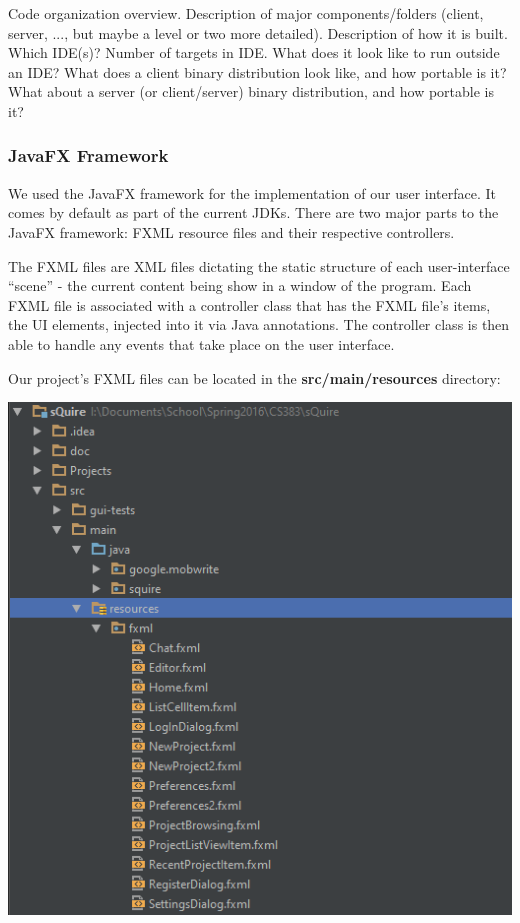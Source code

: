 \documentclass[twoside,letterpaper]{article}
\begin{document}
Code organization overview. Description of major components/folders (client, server, ..., but maybe a level or two more detailed). Description of how it is built. Which IDE(s)? Number of targets in IDE. What does it look like to run outside an IDE? What does a client binary distribution look like, and how portable is it? What about a server (or client/server) binary distribution, and how portable is it?


\subsubsection{JavaFX Framework}

We used the JavaFX framework for the implementation of our user interface. It comes by default as part of the current JDKs. There are two major parts to the JavaFX framework: FXML resource files and their respective controllers.


The FXML files are XML files dictating the static structure of each user-interface ``scene'' - the current content being show in a window of the program. Each FXML file is associated with a controller class that has the FXML file's items, the UI elements, injected into it via Java annotations. The controller class is then able to handle any events that take place on the user interface. 


Our project's FXML files can be located in the \textbf{src/main/resources} directory: \bigskip


\begin{center}
	\includegraphics[scale=1]{images/Implementation/Resources.png}
\end{center}
\end{document}
